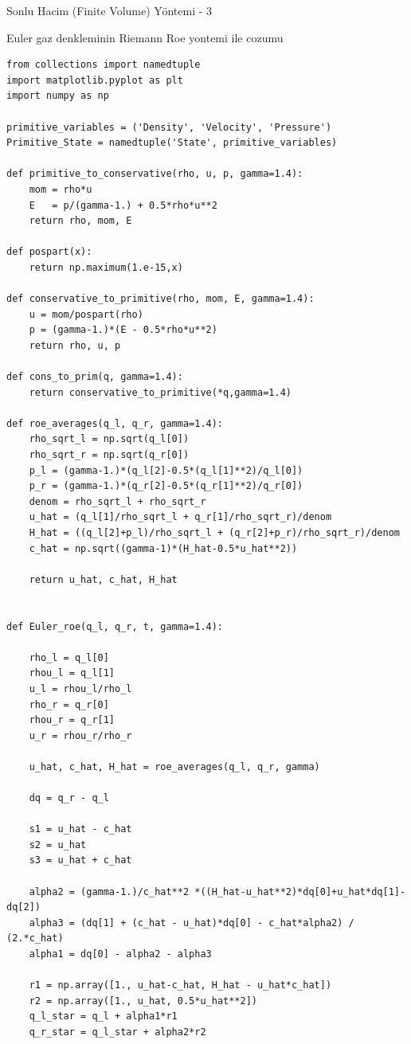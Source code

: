 \documentclass[12pt,fleqn]{article}\usepackage{../../common}
\begin{document}
Sonlu Hacim (Finite Volume) Yöntemi - 3

Euler gaz denkleminin Riemann Roe yontemi ile cozumu

\begin{verbatim}
from collections import namedtuple
import matplotlib.pyplot as plt
import numpy as np

primitive_variables = ('Density', 'Velocity', 'Pressure')
Primitive_State = namedtuple('State', primitive_variables)

def primitive_to_conservative(rho, u, p, gamma=1.4):
    mom = rho*u
    E   = p/(gamma-1.) + 0.5*rho*u**2
    return rho, mom, E

def pospart(x):
    return np.maximum(1.e-15,x)

def conservative_to_primitive(rho, mom, E, gamma=1.4):
    u = mom/pospart(rho)
    p = (gamma-1.)*(E - 0.5*rho*u**2)
    return rho, u, p

def cons_to_prim(q, gamma=1.4):
    return conservative_to_primitive(*q,gamma=1.4)

def roe_averages(q_l, q_r, gamma=1.4):
    rho_sqrt_l = np.sqrt(q_l[0])
    rho_sqrt_r = np.sqrt(q_r[0])
    p_l = (gamma-1.)*(q_l[2]-0.5*(q_l[1]**2)/q_l[0])
    p_r = (gamma-1.)*(q_r[2]-0.5*(q_r[1]**2)/q_r[0])
    denom = rho_sqrt_l + rho_sqrt_r
    u_hat = (q_l[1]/rho_sqrt_l + q_r[1]/rho_sqrt_r)/denom
    H_hat = ((q_l[2]+p_l)/rho_sqrt_l + (q_r[2]+p_r)/rho_sqrt_r)/denom
    c_hat = np.sqrt((gamma-1)*(H_hat-0.5*u_hat**2))
    
    return u_hat, c_hat, H_hat
    
    
def Euler_roe(q_l, q_r, t, gamma=1.4):
    
    rho_l = q_l[0]
    rhou_l = q_l[1]
    u_l = rhou_l/rho_l
    rho_r = q_r[0]
    rhou_r = q_r[1]
    u_r = rhou_r/rho_r
    
    u_hat, c_hat, H_hat = roe_averages(q_l, q_r, gamma)

    dq = q_r - q_l
    
    s1 = u_hat - c_hat
    s2 = u_hat
    s3 = u_hat + c_hat
    
    alpha2 = (gamma-1.)/c_hat**2 *((H_hat-u_hat**2)*dq[0]+u_hat*dq[1]-dq[2])
    alpha3 = (dq[1] + (c_hat - u_hat)*dq[0] - c_hat*alpha2) / (2.*c_hat)
    alpha1 = dq[0] - alpha2 - alpha3
    
    r1 = np.array([1., u_hat-c_hat, H_hat - u_hat*c_hat])
    r2 = np.array([1., u_hat, 0.5*u_hat**2])
    q_l_star = q_l + alpha1*r1
    q_r_star = q_l_star + alpha2*r2
    

\end{verbatim}
\end{document}
